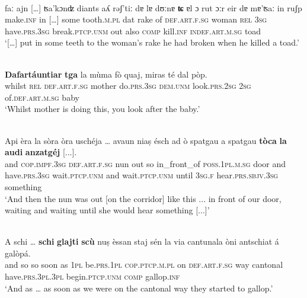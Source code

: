 \ea\label{}
\\
\gll    […] faː ajn […] ʦa’kɔnʣ diants aʎ rǝʃ’tiː dɐ lɐ dʊːnɐ \textbf{ʨ} ɐl ɔ rut ɔːr eir dɐ mɐ’ʦaː in ruʃp\\
    […] make.\textsc{inf} in […] some tooth.\textsc{m.pl} {dat} rake of \textsc{def.art.f.sg} woman \textsc{rel} \textsc{3sg} have.\textsc{prs.3sg} break.\textsc{ptcp.unm} out also \textsc{comp} kill.\textsc{inf} \textsc{indef.art.m.sg} toad\\
\glt `[…] put in some teeth to the woman’s rake he had broken when he killed a toad.'
\z


\ea
\label{}
\\
\gll \textbf{Dafartáuntiar} \textbf{tga} la mùma fò quaj, miras té dal pòp.\\
whilst \textsc{rel} \textsc{def.art.f.sg} mother do.\textsc{prs.3sg} \textsc{dem.unm} look.\textsc{prs.2sg} \textsc{2sg} of.\textsc{def.art.m.sg} baby\\
\glt `Whilst mother is doing this, you look after the baby.'
\z

\ea
\label{}
\\
\gll    Api èra la sòra òra uschéja … avaun niaṣ ésch ad ò spatgau a spatgau \textbf{tòca} \textbf{la} \textbf{audi} \textbf{anzatgéj} [...].\\
and \textsc{cop.impf.3sg} \textsc{def.art.f.sg} nun out so {} in\_front\_of \textsc{poss.1pl.m.sg} door and have.\textsc{prs.3sg} wait.\textsc{ptcp.unm} and wait.\textsc{ptcp.unm} until \textsc{3sg.f} hear.\textsc{prs.sbjv.3sg} something\\
\glt `And then the nun was out [on the corridor] like this ... in front of our door, waiting and waiting until she would hear something [...]'
\z

\ea
\label{}
\\
\gll  A schi … \textbf{schi} \textbf{glajti} \textbf{scù} nuṣ èssan staj sén la via cantunala òni antschiat á galòpá.  \\
and so {} so soon as \textsc{1pl} be.\textsc{prs.1pl} \textsc{cop.ptcp.m.pl} on \textsc{def.art.f.sg} way cantonal have.\textsc{prs.3pl.3pl} begin.\textsc{ptcp.unm} \textsc{comp} gallop.\textsc{inf}\\
\glt `And as … as soon as we were on the cantonal way they started to gallop.'
\z



